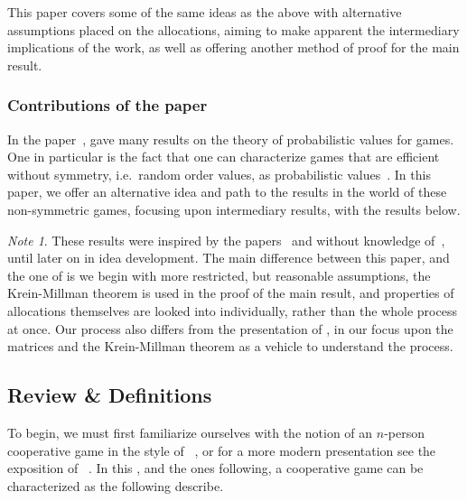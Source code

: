 \documentclass[12pt,letterpaper,final]{article}
\theoremstyle{plain}
\theoremstyle{plain}
\theoremstyle{plain}
\theoremstyle{plain}
\theoremstyle{plain}
\theoremstyle{plain}
\theoremstyle{plain}
\theoremstyle{definition}
\theoremstyle{definition}
\theoremstyle{definition}
\theoremstyle{definition}
\theoremstyle{definition}
\theoremstyle{remark}
\theoremstyle{remark}
\newtheorem*{note}{Note}
\theoremstyle{remark}
\theoremstyle{remark}
\begin{document}
This paper covers some of the same ideas as the above with alternative
assumptions placed on the allocations, aiming to make apparent the intermediary
implications of the work, as well as offering another method of proof
for the main result.

\subsubsection{Contributions of the paper}

In the paper~\cite{Weber78}, \citeauthor{Weber78} gave many results on
the theory of probabilistic values for games. One in particular is the
fact that one can characterize games that are efficient without
symmetry, i.e.\ random order values, as probabilistic
values~\cite[Theorems 12 and 13]{Weber78}. In this
paper, we offer an alternative idea and path to the results in
the world of these non-symmetric games, focusing upon intermediary
results, with the results below.

\begin{note}
  These results were inspired by the papers~\cite{Owen72,Shapley53}
  and without knowledge of~\cite{Weber78, Derks87}, until later on in idea
  development. The main difference between this paper, and the one of
  \citeauthor{Weber78} is we begin with more restricted, but
  reasonable assumptions, the Krein-Millman theorem is used
  in the proof of the main result, and properties of allocations
  themselves are looked into individually, rather than the whole
  process at once.
  Our process also differs from the presentation of \cite{Derks87}, in
  our focus upon the matrices and the Krein-Millman theorem as a
  vehicle to understand  the process.
\end{note}


\subsection{Review \& Definitions}\label{sec:literature-review}

To begin, we must first familiarize ourselves with the notion of an
\(n\)-person cooperative game in the style of
\citeauthor{Shapley53}~\cite{Shapley53}, or for a more modern
presentation see the exposition of  \citeauthor{Maschler13}~\cite{Maschler13}. In this
, and the ones following, a cooperative game can 
be characterized as the following  describe.
\end{document}
